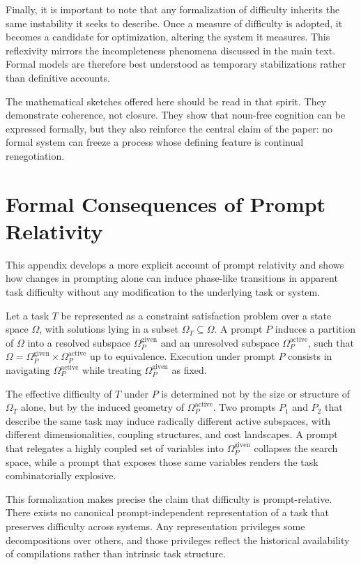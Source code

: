 \documentclass[12pt]{article}
\begin{document}
Finally, it is important to note that any formalization of difficulty inherits the same instability it seeks to describe. Once a measure of difficulty is adopted, it becomes a candidate for optimization, altering the system it measures. This reflexivity mirrors the incompleteness phenomena discussed in the main text. Formal models are therefore best understood as temporary stabilizations rather than definitive accounts.

The mathematical sketches offered here should be read in that spirit. They demonstrate coherence, not closure. They show that noun-free cognition can be expressed formally, but they also reinforce the central claim of the paper: no formal system can freeze a process whose defining feature is continual renegotiation.

\section{Formal Consequences of Prompt Relativity}

This appendix develops a more explicit account of prompt relativity and shows how changes in prompting alone can induce phase-like transitions in apparent task difficulty without any modification to the underlying task or system.

Let a task $T$ be represented as a constraint satisfaction problem over a state space $\Omega$, with solutions lying in a subset $\Omega_T \subseteq \Omega$. A prompt $P$ induces a partition of $\Omega$ into a resolved subspace $\Omega_P^{\mathrm{given}}$ and an unresolved subspace $\Omega_P^{\mathrm{active}}$, such that $\Omega = \Omega_P^{\mathrm{given}} \times \Omega_P^{\mathrm{active}}$ up to equivalence. Execution under prompt $P$ consists in navigating $\Omega_P^{\mathrm{active}}$ while treating $\Omega_P^{\mathrm{given}}$ as fixed.

The effective difficulty of $T$ under $P$ is determined not by the size or structure of $\Omega_T$ alone, but by the induced geometry of $\Omega_P^{\mathrm{active}}$. Two prompts $P_1$ and $P_2$ that describe the same task may induce radically different active subspaces, with different dimensionalities, coupling structures, and cost landscapes. A prompt that relegates a highly coupled set of variables into $\Omega_P^{\mathrm{given}}$ collapses the search space, while a prompt that exposes those same variables renders the task combinatorially explosive.

This formalization makes precise the claim that difficulty is prompt-relative. There exists no canonical prompt-independent representation of a task that preserves difficulty across systems. Any representation privileges some decompositions over others, and those privileges reflect the historical availability of compilations rather than intrinsic task structure.
\end{document}
